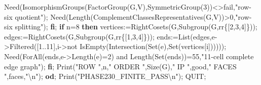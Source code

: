 \documentclass[
  11pt,
  a4paper,
]{article}
\newenvironment{Shaded}{}{}
\newcommand{\BuiltInTok}[1]{\textcolor[rgb]{0.00,0.50,0.00}{#1}}
\newcommand{\ConstantTok}[1]{\textcolor[rgb]{0.53,0.00,0.00}{#1}}
\newcommand{\ControlFlowTok}[1]{\textcolor[rgb]{0.00,0.44,0.13}{\textbf{#1}}}
\newcommand{\FloatTok}[1]{\textcolor[rgb]{0.25,0.63,0.44}{#1}}
\newcommand{\NormalTok}[1]{#1}
\newcommand{\OperatorTok}[1]{\textcolor[rgb]{0.40,0.40,0.40}{#1}}
\newcommand{\StringTok}[1]{\textcolor[rgb]{0.25,0.44,0.63}{#1}}
\newcommand{\VariableTok}[1]{\textcolor[rgb]{0.10,0.09,0.49}{#1}}
\begin{document}
\begin{Shaded}
\begin{Highlighting}[]
    \VariableTok{Need}\NormalTok{(}\BuiltInTok{IsomorphismGroups}\NormalTok{(}\BuiltInTok{FactorGroup}\NormalTok{(}\VariableTok{G}\OperatorTok{,}\VariableTok{V}\NormalTok{)}\OperatorTok{,}\BuiltInTok{SymmetricGroup}\NormalTok{(}\FloatTok{3}\NormalTok{))}\OperatorTok{\textless{}\textgreater{}}\ConstantTok{fail}\OperatorTok{,}\StringTok{"row{-}six quotient"}\NormalTok{)}\OperatorTok{;}
    \VariableTok{Need}\NormalTok{(}\BuiltInTok{Length}\NormalTok{(}\VariableTok{ComplementClassesRepresentatives}\NormalTok{(}\VariableTok{G}\OperatorTok{,}\VariableTok{V}\NormalTok{))}\OperatorTok{\textgreater{}}\FloatTok{0}\OperatorTok{,}\StringTok{"row{-}six splitting"}\NormalTok{)}\OperatorTok{;}
  \ControlFlowTok{fi}\OperatorTok{;}
  \ControlFlowTok{if} \VariableTok{n}\OperatorTok{=}\FloatTok{8} \ControlFlowTok{then}
    \VariableTok{vertices}\OperatorTok{:=}\BuiltInTok{RightCosets}\NormalTok{(}\VariableTok{G}\OperatorTok{,}\BuiltInTok{Subgroup}\NormalTok{(}\VariableTok{G}\OperatorTok{,}\VariableTok{rr}\NormalTok{\{[}\FloatTok{2}\OperatorTok{,}\FloatTok{3}\OperatorTok{,}\FloatTok{4}\NormalTok{]\}))}\OperatorTok{;}
    \VariableTok{edges}\OperatorTok{:=}\BuiltInTok{RightCosets}\NormalTok{(}\VariableTok{G}\OperatorTok{,}\BuiltInTok{Subgroup}\NormalTok{(}\VariableTok{G}\OperatorTok{,}\VariableTok{rr}\NormalTok{\{[}\FloatTok{1}\OperatorTok{,}\FloatTok{3}\OperatorTok{,}\FloatTok{4}\NormalTok{]\}))}\OperatorTok{;}
    \VariableTok{ends}\OperatorTok{:=}\BuiltInTok{List}\NormalTok{(}\VariableTok{edges}\OperatorTok{,}\VariableTok{e}\OperatorTok{{-}\textgreater{}}\BuiltInTok{Filtered}\NormalTok{([}\FloatTok{1}\OperatorTok{..}\FloatTok{11}\NormalTok{]}\OperatorTok{,}\VariableTok{i}\OperatorTok{{-}\textgreater{}}\ConstantTok{not} \BuiltInTok{IsEmpty}\NormalTok{(}\BuiltInTok{Intersection}\NormalTok{(}\BuiltInTok{Set}\NormalTok{(}\VariableTok{e}\NormalTok{)}\OperatorTok{,}\BuiltInTok{Set}\NormalTok{(}\VariableTok{vertices}\NormalTok{[}\VariableTok{i}\NormalTok{])))))}\OperatorTok{;}
    \VariableTok{Need}\NormalTok{(}\BuiltInTok{ForAll}\NormalTok{(}\VariableTok{ends}\OperatorTok{,}\VariableTok{e}\OperatorTok{{-}\textgreater{}}\BuiltInTok{Length}\NormalTok{(}\VariableTok{e}\NormalTok{)}\OperatorTok{=}\FloatTok{2}\NormalTok{) }\ConstantTok{and} \BuiltInTok{Length}\NormalTok{(}\BuiltInTok{Set}\NormalTok{(}\VariableTok{ends}\NormalTok{))}\OperatorTok{=}\FloatTok{55}\OperatorTok{,}\StringTok{"11{-}cell complete edge graph"}\NormalTok{)}\OperatorTok{;}
  \ControlFlowTok{fi}\OperatorTok{;}
  \BuiltInTok{Print}\NormalTok{(}\StringTok{"ROW "}\OperatorTok{,}\VariableTok{n}\OperatorTok{,}\StringTok{" ORDER "}\OperatorTok{,}\BuiltInTok{Size}\NormalTok{(}\VariableTok{G}\NormalTok{)}\OperatorTok{,}\StringTok{" IP "}\OperatorTok{,}\VariableTok{good}\OperatorTok{,}\StringTok{" FACES "}\OperatorTok{,}\VariableTok{faces}\OperatorTok{,}\StringTok{"\textbackslash{}n"}\NormalTok{)}\OperatorTok{;}
\ControlFlowTok{od}\OperatorTok{;}
\BuiltInTok{Print}\NormalTok{(}\StringTok{"PHASE230\_FINITE\_PASS\textbackslash{}n"}\NormalTok{)}\OperatorTok{;}
\VariableTok{QUIT}\OperatorTok{;}
\end{Highlighting}
\end{Shaded}
\end{document}
